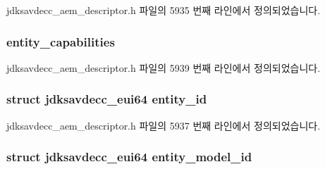 jdksavdecc\+\_\+aem\+\_\+descriptor.\+h 파일의 5935 번째 라인에서 정의되었습니다.

\subsubsection[{\texorpdfstring{entity\+\_\+capabilities}{entity_capabilities}}]{ entity\+\_\+capabilities}\hypertarget{structjdksavdecc__descriptor__entity_ae3350328f131c8382ba5030939a2a484}{}\label{structjdksavdecc__descriptor__entity_ae3350328f131c8382ba5030939a2a484}


jdksavdecc\+\_\+aem\+\_\+descriptor.\+h 파일의 5939 번째 라인에서 정의되었습니다.

\subsubsection[{\texorpdfstring{entity\+\_\+id}{entity_id}}]{\setlength{\rightskip}{0pt plus 5cm}struct {\bf jdksavdecc\+\_\+eui64} entity\+\_\+id}\hypertarget{structjdksavdecc__descriptor__entity_a26ec635a862a0163fe5b1ff90b5f4885}{}\label{structjdksavdecc__descriptor__entity_a26ec635a862a0163fe5b1ff90b5f4885}


jdksavdecc\+\_\+aem\+\_\+descriptor.\+h 파일의 5937 번째 라인에서 정의되었습니다.

\subsubsection[{\texorpdfstring{entity\+\_\+model\+\_\+id}{entity_model_id}}]{\setlength{\rightskip}{0pt plus 5cm}struct {\bf jdksavdecc\+\_\+eui64} entity\+\_\+model\+\_\+id}\hypertarget{structjdksavdecc__descriptor__entity_a2d1d52d1ec5c6100b61acf3daa452c56}{}\label{structjdksavdecc__descriptor__entity_a2d1d52d1ec5c6100b61acf3daa452c56}


